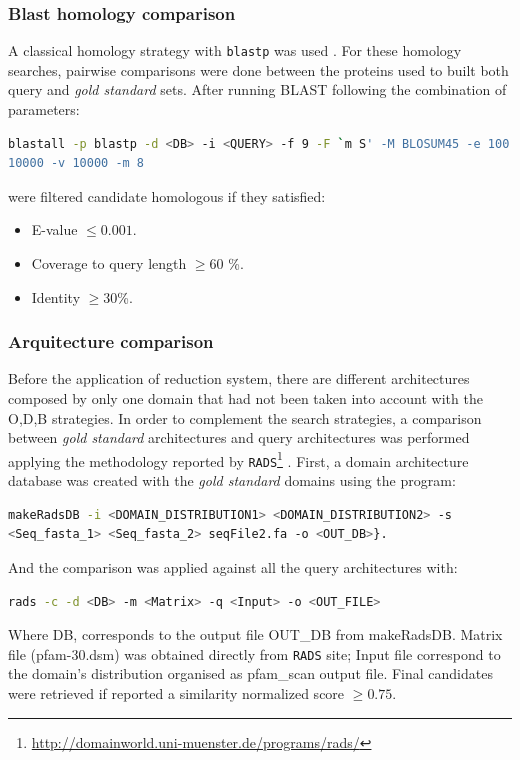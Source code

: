 \documentclass[11pt]{article}
\begin{document}
\subsubsection*{\textbf{B}last homology comparison}
A classical homology strategy with \texttt{blastp} was used \cite{Korf:2003}. 
For these homology searches, pairwise comparisons were done between the 
proteins used to built both query and \textsl{gold standard} sets. After running 
BLAST following the combination of parameters: 
\begin{lstlisting}[language=bash, breaklines=true]
blastall -p blastp -d <DB> -i <QUERY> -f 9 -F `m S' -M BLOSUM45 -e 100 -b 
10000 -v 10000 -m 8
\end{lstlisting}

were filtered candidate homologous if they satisfied:
\begin{itemize}
\item E-value $\leq 0.001$.
\item Coverage to query length $\geq 60$ \%.
\item Identity $\geq 30$\%.
\end{itemize}

\subsubsection*{\textbf{A}rquitecture comparison}
Before the application of reduction system, there are different 
architectures composed by only one domain that had not been taken into account 
with the O,D,B strategies. In order to complement the search strategies, a
comparison between \textsl{gold standard} architectures and query architectures 
was performed applying the methodology reported 
by 
\texttt{RADS}\footnote{\url{http://domainworld.uni-muenster.de/programs/rads/} 
} \cite{Terrapon:2014}. First, a domain architecture database was created 
with the \textsl{gold standard} domains using the program: 
\begin{lstlisting}[language=bash, breaklines=true]
makeRadsDB -i <DOMAIN_DISTRIBUTION1> <DOMAIN_DISTRIBUTION2> -s 
<Seq_fasta_1> <Seq_fasta_2> seqFile2.fa -o <OUT_DB>}. 
\end{lstlisting} 
And the comparison was applied against all the query architectures with: 
\begin{lstlisting}[language=bash, breaklines=true]
rads -c -d <DB> -m <Matrix> -q <Input> -o <OUT_FILE>
\end{lstlisting}
Where DB, corresponds to the output file OUT\_DB from makeRadsDB. Matrix file 
(pfam-30.dsm) was obtained directly from \texttt{RADS} site; Input file 
correspond to the domain's distribution organised as pfam\_scan output 
file. Final candidates were retrieved if reported a similarity normalized score 
$\geq 0.75$.
\end{document}
